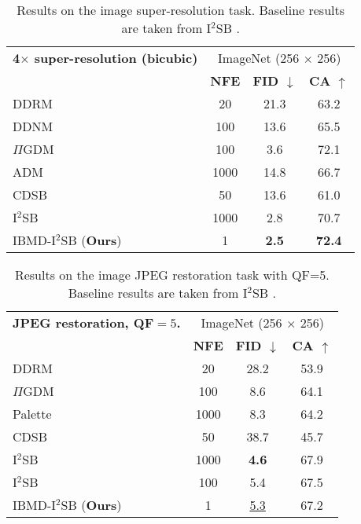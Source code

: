 \begin{table}[ht]
\centering
\caption{Results on the image super-resolution task. Baseline results are taken from I$^2$SB \citep{liu20232}.}
\label{tab:sr-bicubic}
\begin{tabular}{lccc}
\toprule
\textbf{4$\times$ super-resolution (bicubic)} & \multicolumn{3}{c}{ImageNet (256 $\times$ 256)} \\ \cmidrule(lr){2-4} 
 & \textbf{NFE} & \textbf{FID $\downarrow$} & \textbf{CA $\uparrow$} \\ \midrule
DDRM \cite{kawar2022denoising} & 20 & 21.3 & 63.2 \\
DDNM \citep{wang2023zeroshot} & 100 & 13.6 & 65.5 \\
$\Pi$GDM \cite{song2023pseudoinverse} & 100 & 3.6 & 72.1 \\
ADM \citep{dhariwal2021diffusion} & 1000 & 14.8 & 66.7 \\
CDSB \citep{shi2022conditional} & 50 & 13.6 & 61.0 \\
I$^2$SB \cite{liu20232} & 1000 & 2.8 & 70.7 \\ 
\midrule
IBMD-I$^2$SB (\textbf{Ours}) & 1 & \textbf{2.5} & \textbf{72.4} \\ 
\bottomrule
\end{tabular}
\vspace{-6mm}
\end{table}

\begin{table}[ht]
\centering
\caption{Results on the image JPEG restoration task with QF=5. Baseline results are taken from I$^2$SB \citep{liu20232}.}
\label{tab:jpeg-5}
\begin{tabular}{lccc}
\toprule
\textbf{JPEG restoration, QF$=5$.} & \multicolumn{3}{c}{ImageNet (256 $\times$ 256)} \\ \cmidrule(lr){2-4} 
 & \textbf{NFE} & \textbf{FID $\downarrow$} & \textbf{CA $\uparrow$} \\ \midrule
DDRM \cite{kawar2022denoising} & 20 & 28.2 & 53.9 \\
$\Pi$GDM \cite{song2023pseudoinverse} & 100 & 8.6 & 64.1 \\
Palette \citep{saharia2022palette} & 1000 & 8.3 & 64.2 \\
CDSB \citep{shi2022conditional} & 50 & 38.7 & 45.7 \\
I$^2$SB \cite{liu20232} & 1000 & \textbf{4.6} & 67.9 \\ 
I$^2$SB \cite{liu20232} & 100 & 5.4 & 67.5 \\ 
\midrule
IBMD-I$^2$SB (\textbf{Ours}) & 1 & \underline{5.3} & 67.2 \\ 
\bottomrule
\end{tabular}
\vspace{-6mm}
\end{table}
